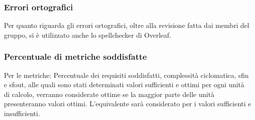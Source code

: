 \subsubsection{Errori ortografici}

Per quanto riguarda gli errori ortografici, oltre alla revisione fatta dai membri del gruppo, si è utilizzato anche lo spellchecker di Overleaf.

\subsubsection{Percentuale di metriche soddisfatte}
    Per le metriche: Percentuale dei requisiti soddisfatti, complessità ciclomatica, sfin e sfout, alle quali sono stati determinati valori sufficienti e ottimi per ogni unità di calcolo,
    verranno considerate ottime se la maggior parte delle unità presenteranno valori ottimi. L'equivalente
    sarà considerato per i valori sufficienti e insufficienti. 


